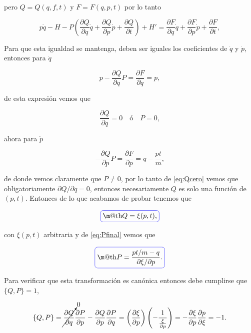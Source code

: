 \documentclass[a4paper,10pt]{article}
\makeatletter
\numberwithin{equation}{section}
\newcommand*{\boxcolor}{blue}
\renewcommand{\boxed}[1]{\textcolor{\boxcolor}{%
\tikz[baseline={([yshift=-1ex]current bounding box.center)}] \node [rectangle, minimum width=1ex,rounded corners,draw] {\normalcolor\m@th$\displaystyle#1$};}}
\makeatother
\begin{document}
pero $Q = Q(q,f,t)$ y  $F = F(q,p,t)$ por lo tanto 

\begin{equation}
 p\dot{q} - H - P\left(\frac{\partial Q}{\partial q}\dot{q} 
 + \frac{\partial Q}{\partial p}\dot{p} + \frac{\partial Q}{\partial t} \right) + 
 H' = \frac{\partial F}{\partial q}\dot{q} 
 + \frac{\partial F}{\partial p}\dot{p} + \frac{\partial F}{\partial t},
\end{equation}

Para que esta igualdad se mantenga, deben ser iguales los coeficientes 
de $\dot{q}$ y $\dot{p}$, entonces para $\dot{q}$

\begin{equation}
 p - \frac{\partial Q}{\partial q}P = \frac{\partial F}{\partial q} = p,
\end{equation}

de esta expresión vemos que 

\begin{equation}
 \frac{\partial Q}{\partial q}= 0\quad \text{ó} \quad P = 0,
 \label{eq:Qcero}
\end{equation}

ahora para $\dot{p}$

\begin{equation}
 - \frac{\partial Q}{\partial p} P = \frac{\partial F}{\partial p} = q - \frac{pt}{m},
\label{eq:Pfinal}
\end{equation}

de donde vemos claramente que $P \ne 0$, por lo tanto de \eqref{eq:Qcero} vemos que 
obligatoriamente $\partial Q / \partial q = 0$, entonces necesariamente $Q$ es solo 
una función de $(p,t)$. Entonces de lo que acabamos de probar tenemos que 

\begin{equation}
  \boxed{Q = \xi(p,t),}
\end{equation}

con $\xi(p,t)$ arbitraria y de \eqref{eq:Pfinal} vemos que 

\begin{equation}
 \boxed{P = \frac{pt/m - q}{\partial \xi/\partial p}.}
\end{equation}

Para verificar que esta transformación es canónica entonces debe cumplirse que 
$\{Q,P\} = 1$, 

\begin{equation}
 \{Q,P\} = \cancelto{0}{\frac{\partial Q}{\partial q}}\frac{\partial P}{\partial p} - 
 \frac{\partial Q}{\partial p}\frac{\partial P}{\partial q} = 
 \left(\frac{\partial \xi}{\partial p}\right)\left(- \frac{1}{\frac{\xi}{\partial p}} \right) = 
 - \frac{\partial \xi}{\partial p}\frac{\partial p}{\partial \xi} = -1.
\end{equation}
\end{document}
